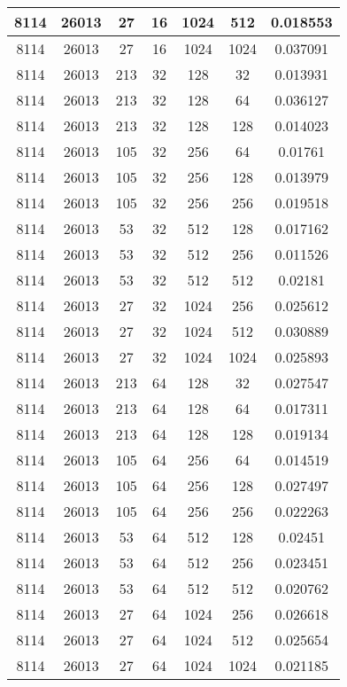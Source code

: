\documentclass[9pt]{article}
\begin{document}
\begin{tabular}{|c|c|c|c|c|c|c| }
\hline
8114  & 26013  & 27  & 16  & 1024  & 512  & 0.018553 \\
\hline
8114  & 26013  & 27  & 16  & 1024  & 1024  & 0.037091 \\
\hline
8114  & 26013  & 213  & 32  & 128  & 32  & 0.013931 \\
\hline
8114  & 26013  & 213  & 32  & 128  & 64  & 0.036127 \\
\hline
8114  & 26013  & 213  & 32  & 128  & 128  & 0.014023 \\
\hline
8114  & 26013  & 105  & 32  & 256  & 64  & 0.01761 \\
\hline
8114  & 26013  & 105  & 32  & 256  & 128  & 0.013979 \\
\hline
8114  & 26013  & 105  & 32  & 256  & 256  & 0.019518 \\
\hline
8114  & 26013  & 53  & 32  & 512  & 128  & 0.017162 \\
\hline
8114  & 26013  & 53  & 32  & 512  & 256  & 0.011526 \\
\hline
8114  & 26013  & 53  & 32  & 512  & 512  & 0.02181 \\
\hline
8114  & 26013  & 27  & 32  & 1024  & 256  & 0.025612 \\
\hline
8114  & 26013  & 27  & 32  & 1024  & 512  & 0.030889 \\
\hline
8114  & 26013  & 27  & 32  & 1024  & 1024  & 0.025893 \\
\hline
8114  & 26013  & 213  & 64  & 128  & 32  & 0.027547 \\
\hline
8114  & 26013  & 213  & 64  & 128  & 64  & 0.017311 \\
\hline
8114  & 26013  & 213  & 64  & 128  & 128  & 0.019134 \\
\hline
8114  & 26013  & 105  & 64  & 256  & 64  & 0.014519 \\
\hline
8114  & 26013  & 105  & 64  & 256  & 128  & 0.027497 \\
\hline
8114  & 26013  & 105  & 64  & 256  & 256  & 0.022263 \\
\hline
8114  & 26013  & 53  & 64  & 512  & 128  & 0.02451 \\
\hline
8114  & 26013  & 53  & 64  & 512  & 256  & 0.023451 \\
\hline
8114  & 26013  & 53  & 64  & 512  & 512  & 0.020762 \\
\hline
8114  & 26013  & 27  & 64  & 1024  & 256  & 0.026618 \\
\hline
8114  & 26013  & 27  & 64  & 1024  & 512  & 0.025654 \\
\hline
8114  & 26013  & 27  & 64  & 1024  & 1024  & 0.021185 \\

\end{tabular}
\end{document}
